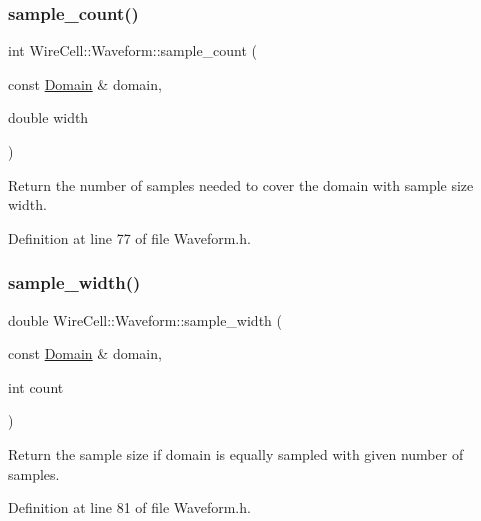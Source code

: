 \subsubsection{\texorpdfstring{sample\+\_\+count()}{sample\_count()}}
{\footnotesize\ttfamily int Wire\+Cell\+::\+Waveform\+::sample\+\_\+count (\begin{DoxyParamCaption}\item[{const \hyperlink{namespace_wire_cell_1_1_waveform_aa783b1c2a84242349d5c798b7483727b}{Domain} \&}]{domain,  }\item[{double}]{width }\end{DoxyParamCaption})\hspace{0.3cm}{\ttfamily [inline]}}



Return the number of samples needed to cover the domain with sample size width. 



Definition at line 77 of file Waveform.\+h.

\mbox{\label{namespace_wire_cell_1_1_waveform_a76b0099d7c51a9e0a915bbee0fe48069}} 
\subsubsection{\texorpdfstring{sample\+\_\+width()}{sample\_width()}}
{\footnotesize\ttfamily double Wire\+Cell\+::\+Waveform\+::sample\+\_\+width (\begin{DoxyParamCaption}\item[{const \hyperlink{namespace_wire_cell_1_1_waveform_aa783b1c2a84242349d5c798b7483727b}{Domain} \&}]{domain,  }\item[{int}]{count }\end{DoxyParamCaption})\hspace{0.3cm}{\ttfamily [inline]}}



Return the sample size if domain is equally sampled with given number of samples. 



Definition at line 81 of file Waveform.\+h.

